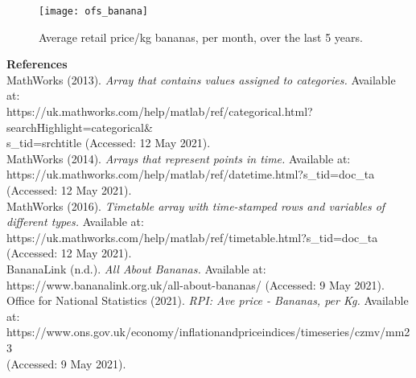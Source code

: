 \documentclass[a4paper,12pt]{article}
\begin{document}
\begin{figure}[h]
\centering
\texttt{[image: ofs\_banana]}
\caption{Average retail price/kg bananas, per month, over the last 5 years.}
\end{figure}
\newpage

\noindent\textbf{References} \\

\noindent[1] MathWorks (2013). \textit{Array that contains values assigned to categories.} Available at:\\ https://uk.mathworks.com/help/matlab/ref/categorical.html?searchHighlight=categorical\&\\s\_tid=srchtitle (Accessed: 12 May 2021). \\

\noindent[2] MathWorks (2014). \textit{Arrays that represent points in time.} Available at:\\ https://uk.mathworks.com/help/matlab/ref/datetime.html?s\_tid=doc\_ta \\ (Accessed: 12 May 2021). \\

\noindent[3] MathWorks (2016). \textit{Timetable array with time-stamped rows and variables of different types.} Available at: https://uk.mathworks.com/help/matlab/ref/timetable.html?s\_tid=doc\_ta \\ (Accessed: 12 May 2021). \\

\noindent[4] BananaLink (n.d.). \textit{All About Bananas.} Available at: https://www.bananalink.org.uk/all-about-bananas/ (Accessed: 9 May 2021). \\

\noindent[5] Office for National Statistics (2021). \textit{RPI: Ave price - Bananas, per Kg.} Available at: https://www.ons.gov.uk/economy/inflationandpriceindices/timeseries/czmv/mm23 \\ (Accessed: 9 May 2021).
\end{document}
